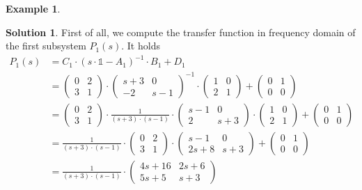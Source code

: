 \documentclass[a4paper,12 pt]{article}
\numberwithin{equation}{section}
\theoremstyle{definition}
\newtheorem{bsp}{Example}
\theoremstyle{remark}
\theoremstyle{definition}
\newtheorem*{lsg}{Solution}
\theoremstyle{definition}
\theoremstyle{definition}
\theoremstyle{remark}
\begin{document}
\begin{bsp}
\begin{lsg}
First of all, we compute the transfer function in frequency domain of the first subsystem $P_1(s)$. It holds
\begin{equation*}
\begin{split}
P_1(s)&=C_1\cdot (s\cdot \mathbb{1}-A_1)^{-1}\cdot B_1 + D_1\\
&=\begin{pmatrix}
0&2\\
3&1
\end{pmatrix}\cdot 
\begin{pmatrix}
s+3&0\\
-2&s-1
\end{pmatrix}^{-1}\cdot \begin{pmatrix}
1&0\\
2&1
\end{pmatrix}+\begin{pmatrix}
0&1\\
0&0
\end{pmatrix}\\
&= \begin{pmatrix}
0&2\\
3&1
\end{pmatrix}\cdot 
\frac{1}{(s+3)\cdot (s-1)}\cdot
\begin{pmatrix}
s-1&0\\
2&s+3
\end{pmatrix}\cdot \begin{pmatrix}
1&0\\
2&1
\end{pmatrix}+\begin{pmatrix}
0&1\\
0&0
\end{pmatrix}\\
&=\frac{1}{(s+3)\cdot (s-1)} \cdot \begin{pmatrix}
0&2\\
3&1
\end{pmatrix}\cdot \begin{pmatrix}
 s-1&0\\
2s+8&s+3
 \end{pmatrix}+\begin{pmatrix}
0&1\\
0&0
\end{pmatrix}\\
&=\frac{1}{(s+3)\cdot (s-1)}\cdot \begin{pmatrix}
 4s+16&2s+6\\
 5s+5&s+3
 \end{pmatrix}\\

\end{split}
\end{equation*}
\end{lsg}
\end{bsp}
\end{document}
